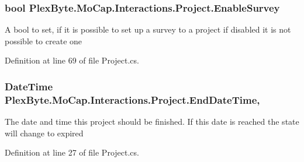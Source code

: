\subsubsection[{\texorpdfstring{Enable\+Survey}{EnableSurvey}}]{\setlength{\rightskip}{0pt plus 5cm}bool Plex\+Byte.\+Mo\+Cap.\+Interactions.\+Project.\+Enable\+Survey\hspace{0.3cm}{\ttfamily [get]}}\hypertarget{class_plex_byte_1_1_mo_cap_1_1_interactions_1_1_project_a38db02bda9f7cb2d264dbc890da9321a}{}\label{class_plex_byte_1_1_mo_cap_1_1_interactions_1_1_project_a38db02bda9f7cb2d264dbc890da9321a}


A bool to set, if it is possible to set up a survey to a project if disabled it is not possible to create one 



Definition at line 69 of file Project.\+cs.

\subsubsection[{\texorpdfstring{End\+Date\+Time}{EndDateTime}}]{\setlength{\rightskip}{0pt plus 5cm}Date\+Time Plex\+Byte.\+Mo\+Cap.\+Interactions.\+Project.\+End\+Date\+Time\hspace{0.3cm}{\ttfamily [get]}, {\ttfamily [set]}}\hypertarget{class_plex_byte_1_1_mo_cap_1_1_interactions_1_1_project_a12da623278dc598539d16694aab4f136}{}\label{class_plex_byte_1_1_mo_cap_1_1_interactions_1_1_project_a12da623278dc598539d16694aab4f136}


The date and time this project should be finished. If this date is reached the state will change to expired 



Definition at line 27 of file Project.\+cs.

